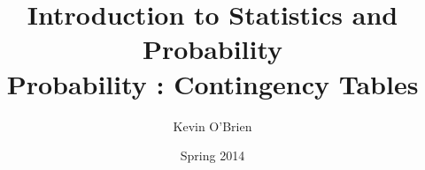 \documentclass[a4]{beamer}
\title[Stats-Lab.com]{\LARGE Introduction to Statistics and Probability \\ {\Large Probability : Contingency Tables}}
\author[Kevin O'Brien]{Kevin O'Brien}
\date{Spring 2014}
\begin{document}
\begin{frame}
\titlepage
\end{frame}






\end{document}
